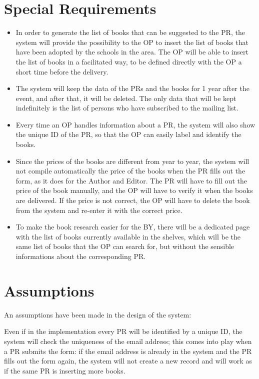 \section{Special Requirements}

\begin{itemize}
    \item In order to generate the list of books that can be suggested to the PR, the system will provide the possibility to the OP to insert the list of books that have been adopted by the schools in the area. The OP will be able to insert the list of books in a facilitated way, to be defined directly with the OP a short time before the delivery.
    \item The system will keep the data of the PRs and the books for 1 year after the event, and after that, it will be deleted. The only data that will be kept indefinitely is the list of persons who have subscribed to the mailing list.
    \item Every time an OP handles information about a PR, the system will also show the unique ID of the PR, so that the OP can easily label and identify the books.
    \item Since the prices of the books are different from year to year, the system will not compile automatically the price of the books when the PR fills out the form, as it does for the Author and Editor. The PR will have to fill out the price of the book manually, and the OP will have to verify it when the books are delivered. If the price is not correct, the OP will have to delete the book from the system and re-enter it with the correct price.
    \item To make the book research easier for the BY, there will be a dedicated page with the list of books currently available in the shelves, which will be the same list of books that the OP can search for, but without the sensible informations about the corresponding PR.
\end{itemize}

\section{Assumptions}
\label{sec:assumptions}

An assumptions have been made in the design of the system:

Even if in the implementation every PR will be identified by a unique ID, the system will check the uniqueness of the email address; this comes into play when a PR submits the form: if the email address is already in the system and the PR fills out the form again, the system will not create a new record and will work as if the same PR is inserting more books.
